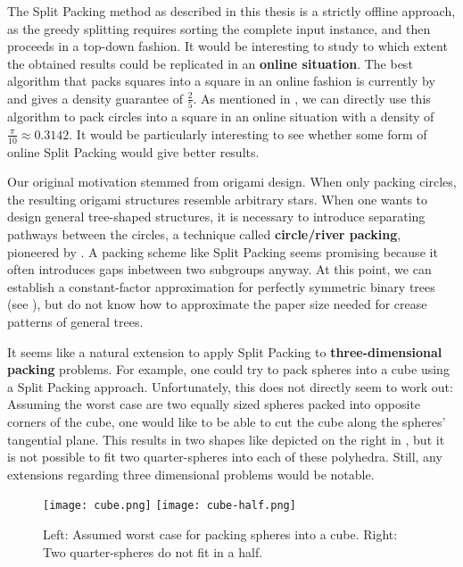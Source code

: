 \documentclass[a4paper,style=print,bibliography=totoc,nexus,lnum,extramargin]{tubsbook}
\begin{document}
The Split Packing method as described in this thesis is a strictly offline approach, as the greedy splitting requires sorting the complete input instance, and then proceeds in a top-down fashion. It would be interesting to study to which extent the obtained results could be replicated in an \textbf{online situation}. The best algorithm that packs squares into a square in an online fashion is currently by \textcite{brubach2014improved} and gives a density guarantee of $\frac{2}{5}$. As mentioned in , we can directly use this algorithm to pack circles into a square in an online situation with a density of $\frac{\pi}{10} \approx 0.3142$. It would be particularly interesting to see whether some form of online Split Packing would give better results.

Our original motivation stemmed from origami design. When only packing circles, the resulting origami structures resemble arbitrary stars. When one wants to design general tree-shaped structures, it is necessary to introduce separating pathways between the circles, a technique called \textbf{circle/river packing}, pioneered by \textcite{lang1996computational}.
A packing scheme like Split Packing seems promising because it often introduces gaps inbetween two subgroups anyway. At this point, we can establish a constant-factor approximation for perfectly symmetric binary trees (see ), but do not know how to approximate the paper size needed for crease patterns of general trees.


It seems like a natural extension to apply Split Packing to \textbf{three-dimensional packing} problems. For example, one could try to pack spheres into a cube using a Split Packing approach. Unfortunately, this does not directly seem to work out: Assuming the worst case are two equally sized spheres packed into opposite corners of the cube, one would like to be able to cut the cube along the spheres' tangential plane. This results in two shapes like depicted on the right in , but it is not possible to fit two quarter-spheres into each of these polyhedra. Still, any extensions regarding three dimensional problems would be notable.

\begin{figure}
    \texttt{[image: cube.png]}
    \texttt{[image: cube-half.png]}
    \caption{Left: Assumed worst case for packing spheres into a cube. Right: Two quarter-spheres do not fit in a half.}\label{fig:cube-half}
\end{figure}
\end{document}
